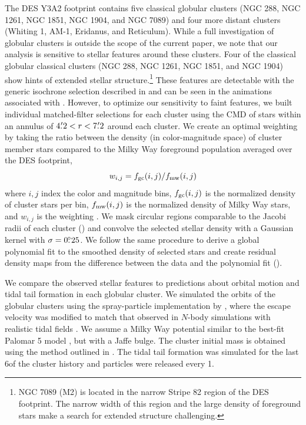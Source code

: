 \documentclass[twocolumn]{aastex61}
\begin{document}
The DES Y3A2 footprint contains five classical globular clusters (NGC 288, NGC 1261, NGC 1851, NGC 1904, and NGC 7089) and four more distant clusters (Whiting 1, AM-1, Eridanus, and Reticulum).
While a full investigation of globular clusters is outside the scope of the current paper, we note that our analysis is sensitive to stellar features around these clusters.
Four of the classical globular classical clusters (NGC 288, NGC 1261, NGC 1851, and NGC 1904) show hints of extended stellar structure.\footnote{NGC 7089 (M2) is located in the narrow Stripe 82 region of the DES footprint. The narrow width of this region and the large density of foreground stars make a search for extended structure challenging.}
These features are detectable with the generic isochrone selection described in  and can be seen in the animations associated with .
However, to optimize our sensitivity to faint features, we built individual matched-filter selections for each cluster using the CMD of stars within an annulus of $4\mbox{$.\mkern-4mu^\prime$}2 < r < 7\mbox{$.\mkern-4mu^\prime$}2$ around each cluster.
We create an optimal weighting by taking the ratio between the density (in color-magnitude space) of cluster member stars compared to the Milky Way foreground population averaged over the DES footprint, 
\begin{equation}
w_{i,j} = f_{\rm gc}(i,j)/f_{\rm mw}(i,j)
\end{equation}
where $i,j$ index the color and magnitude bins, $f_{\rm gc}(i,j)$ is the normalized density of cluster stars per bin, $f_{\rm mw}(i,j)$ is the normalized density of Milky Way stars, and $w_{i,j}$ is the weighting \citep{Rockosi:2002}.
We mask circular regions comparable to the Jacobi radii of each cluster () and convolve the selected stellar density with a Gaussian kernel with $\sigma = 0\mbox{$.\!\!^\circ$}25$.
We follow the same procedure to derive a global polynomial fit to the smoothed density of selected stars and create residual density maps from the difference between the data and the polynomial fit ().

We compare the observed stellar features to predictions about orbital motion and tidal tail formation in each globular cluster.
We simulated the orbits of the globular clusters using the spray-particle implementation by \citet{Kuepper:2012}, where the  escape velocity was modified to match that observed in $N$-body simulations with realistic tidal fields \citep{Claydon:2016}.
We assume a Milky Way potential similar to the best-fit Palomar 5 model \citep{Kuepper:2015}, but with a Jaffe bulge. 
The cluster initial mass is obtained using the method outlined in \citet{Balbinot:2018}.  
The tidal tail formation was simulated for the last 6\Gyr of the cluster history and particles were released every 1\Myr.
\end{document}
